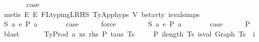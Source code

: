 \begin{isabellebody}
\isanewline
\ \ \ \ \isamarkupfalse%
\ \isamarkupfalse%
\ {\isacharquery}{\kern0pt}case\isanewline
\ \ \ \ \ \ \isamarkupfalse%
\ {\isacharparenleft}{\kern0pt}metis\ E{}\ E{}\ FL{\isacharunderscore}{\kern0pt}typing{\isacharunderscore}{\kern0pt}LRHS\ TyApp{\isachardot}{\kern0pt}hyps{\isacharparenleft}{\kern0pt}{}{\isacharparenright}{\kern0pt}\ V{}\ beta{\isacharunderscore}{\kern0pt}v{\isacharunderscore}{\kern0pt}ty\ is{\isacharunderscore}{\kern0pt}val{\isachardot}{\kern0pt}simps{\isacharparenleft}{\kern0pt}{}{\isacharparenright}{\kern0pt}{\isacharparenright}{\kern0pt}\isanewline
\ \ \isamarkupfalse%
\isanewline
\ \ \ \ \isamarkupfalse%
\ S{\isacharcolon}{\kern0pt}\ {\isachardoublequoteopen}{\isacharparenleft}{\kern0pt}{\isasymexists}a{\isachardot}{\kern0pt}\ e{}\ {\isacharminus}{\kern0pt}{\isachargreater}{\kern0pt}{\isacharbraceleft}{\kern0pt}P{\isacharbraceright}{\kern0pt}\ a{\isacharparenright}{\kern0pt}{\isachardoublequoteclose}\isanewline
\ \ \ \ \isamarkupfalse%
\ \isamarkupfalse%
\ {\isacharquery}{\kern0pt}case\isanewline
\ \ \ \ \isamarkupfalse%
\ force\isanewline
\ \ \isamarkupfalse%
\isanewline
\ \ \ \ \isamarkupfalse%
\ S{\isacharcolon}{\kern0pt}\ {\isachardoublequoteopen}{\isacharparenleft}{\kern0pt}{\isasymexists}a{\isachardot}{\kern0pt}\ e{}\ {\isacharminus}{\kern0pt}{\isachargreater}{\kern0pt}{\isacharbraceleft}{\kern0pt}P{\isacharbraceright}{\kern0pt}\ a{\isacharparenright}{\kern0pt}{\isachardoublequoteclose}\isanewline
\ \ \ \ \isamarkupfalse%
\ \isamarkupfalse%
\ {\isacharquery}{\kern0pt}case\isanewline
\ \ \ \ \isamarkupfalse%
\ P{}\ \isamarkupfalse%
\ blast\isanewline
\ \ \isamarkupfalse%
\isanewline
{}\isamarkupfalse%
\isanewline
\ \ \isamarkupfalse%
\ {\isacharparenleft}{\kern0pt}TyProd\ a\ xs\ rhs\ P\ taus\ Ts\ {\isasymGamma}{\isacharparenright}{\kern0pt}\isanewline
\ \ \isamarkupfalse%
\ P{}{\isacharcolon}{\kern0pt}\ {\isachardoublequoteopen}{\isasymforall}i{\isacharless}{\kern0pt}length\ Ts{\isachardot}{\kern0pt}\ is{\isacharunderscore}{\kern0pt}val\ {\isacharparenleft}{\kern0pt}Graph\ {\isacharparenleft}{\kern0pt}Ts\ {\isacharbang}{\kern0pt}\ i{\isacharparenright}{\kern0pt}{\isacharparenright}{\kern0pt}{\isachardoublequoteclose}\isanewline

\end{isabellebody}
